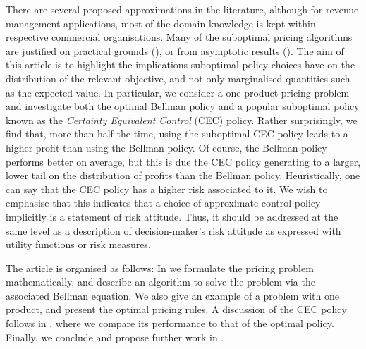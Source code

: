 \documentclass[main.tex]{subfiles}
\begin{document}
There are several proposed approximations in the
literature, although for revenue management applications, most of the domain knowledge is kept within
respective commercial organisations.
Many of the suboptimal pricing algorithms are justified on practical grounds
(\citet{aviv2012dynamic}), or
from asymptotic results (\citet{gallego1994optimal}).
The aim of this article is to highlight the implications suboptimal policy
choices have on the distribution of the relevant objective, and not
only marginalised quantities such as the expected value.
In particular, we consider a one-product pricing problem and
investigate both the optimal Bellman policy and a popular suboptimal
policy known as the \emph{Certainty Equivalent Control} (CEC)
policy.
Rather surprisingly, we find that, more than half the
time, using the suboptimal CEC policy
leads to a higher profit than using the Bellman policy. Of course, the
Bellman policy performs better on average, but
this is due the CEC policy generating to a larger, lower tail on the
distribution of profits than the Bellman policy.
Heuristically, one can say that the CEC policy has a higher risk
associated to it. We wish to emphasise that this indicates that a
choice of approximate control policy implicitly is a statement of
risk attitude. Thus, it should be addressed at the same level as a
description of decision-maker's risk attitude as expressed with
utility functions or risk measures.


The article is organised as follows:
In  we formulate the
pricing problem mathematically, and describe an algorithm to solve the
problem via the associated Bellman equation. We also give an example
of a problem with one product, and present the optimal pricing rules.
A discussion of the CEC policy follows in
, where we compare its
performance to that of
the optimal policy.
Finally, we conclude and propose further work in .

\biblio
\end{document}

